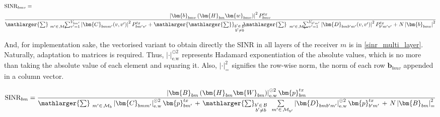 \begin{equation} \label{sinr_single_layer}
\begin{split}
    &\text{SINR}_{bmv} = \\
    &\frac{\left|\bm{b}_{bmv} \left( \bm{H}_{bm} \bm{w}_{bmv} \right)\right|^2 P^{tx}_{bmv}}{\mathlarger{\sum}_{\ m' \in \hspace{.05cm} \mathcal{M}_b} \hspace{-0.2cm} \sum_{v' = 1}^{V_{bm'}} \left| \bm{C}_{bmm'}(v,v')\right|^2 P^{tx}_{bm'v'} + \mathlarger{\mathlarger{\sum}}_{\substack{b' \in \hspace{.05cm} \mathcal{B} \\ b' \neq b}} \hspace{-0.1cm} \mathlarger{\sum}_{\ \hspace{.05cm} m' \in \hspace{.05cm} \mathcal{M}_{b'}} \hspace{-0.35cm} \sum_{v' = 1}^{V_{b'm'}} \left| \bm{D}_{bmb'm'}(v,v') \right|^2 P^{tx}_{b'm'v'} + N \left| \bm{b}_{bmv} \right|^2 }
\end{split}
\end{equation}

And, for implementation sake, the vectorised variant to obtain directly the SINR in all layers of the receiver $m$ is in \ref{sinr_multi_layer}. Naturally, adaptation to matrices is required. Thus, $|\cdot|_{\text{e.w}}^{\odot2}$ represents Hadamard exponentiation of the absolute values, which is no more than taking the absolute value of each element and squaring it. Also, $|\cdot|_{=}^2$ signifies the row-wise norm, the norm of each row $\bm{b}_{bmv}$ appended in a column vector.

\begin{equation} \label{sinr_multi_layer}
    \text{SINR}_{bm} = \frac{\left|\bm{B}_{bm} \left( \bm{H}_{bm} \bm{W}_{bm} \right)\right|_{\text{e.w}}^{\odot2} \bm{p}^{tx}_{bm}}{\mathlarger{\sum}_{\ m' \in \hspace{.05cm} \mathcal{M}_b} \left| \bm{C}_{bmm'}\right|_{\text{e.w}}^{\odot2} \bm{p}^{tx}_{bm'} \hspace{.05cm} + \hspace{.05cm}  \mathlarger{\sum}_{\substack{b' \in \hspace{.05cm} \mathcal{B} \\ b' \neq b}} \sum\limits_{\ \hspace{.05cm} m' \in \hspace{.05cm} \mathcal{M}_{b'}} \left| \bm{D}_{bmb'm'} \right|_{\text{e.w}}^{\odot2} \bm{p}^{tx}_{b'm'} \hspace{.05cm} + \hspace{.05cm} N \left| \bm{B}_{bm} \right|_{=}^2 }
\end{equation}

